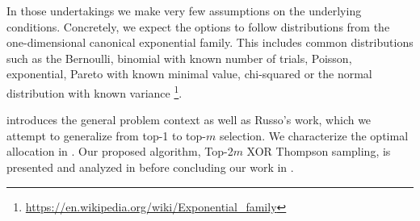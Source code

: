 In those undertakings we make very few assumptions on the underlying conditions.
Concretely, we expect the options to follow distributions from the
one-dimensional canonical exponential family. This includes common distributions
such as the Bernoulli, binomial with known number of trials, Poisson,
exponential, Pareto with known minimal value, chi-squared or the normal
distribution with known
variance \footnote{\url{https://en.wikipedia.org/wiki/Exponential_family}}.

 introduces the general problem context as well as
Russo's work, which we attempt to generalize from top-1 to top-$m$ selection. We
characterize the optimal allocation in . Our proposed
algorithm, Top-2$m$ XOR Thompson sampling, is presented and analyzed in
 before concluding our work in
.
